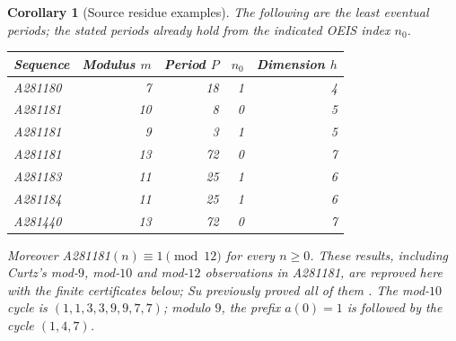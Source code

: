 \documentclass[11pt]{article}
\newtheorem{corollary}{Corollary}
\begin{document}
\begin{corollary}[Source residue examples]\label{certificates}
The following are the least eventual periods; the stated periods
already hold from the indicated OEIS index $n_0$.
\begin{center}
\begin{tabular}{lrrrr}
\toprule
Sequence & Modulus $m$ & Period $P$ & $n_0$ & Dimension $h$\\
\midrule
A281180 & 7 & 18 & 1 & 4\\
A281181 & 10 & 8 & 0 & 5\\
A281181 & 9 & 3 & 1 & 5\\
A281181 & 13 & 72 & 0 & 7\\
A281183 & 11 & 25 & 1 & 6\\
A281184 & 11 & 25 & 1 & 6\\
A281440 & 13 & 72 & 0 & 7\\
\bottomrule
\end{tabular}
\end{center}
Moreover A281181$(n)\equiv1\pmod{12}$ for every $n\ge0$.
These results, including Curtz's mod-$9$, mod-$10$ and mod-$12$
observations in A281181, are reproved here with the finite certificates
below; Su previously proved all of them \cite[Proposition 3.6]{su}.
The mod-$10$ cycle is $(1,1,3,3,9,9,7,7)$; modulo $9$, the
prefix $a(0)=1$ is followed by the cycle $(1,4,7)$.
\end{corollary}
\end{document}
